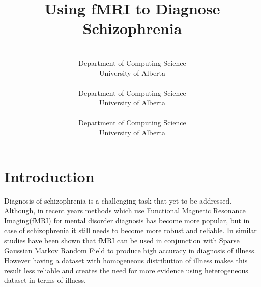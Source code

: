 \documentclass{article} %
\title{Using fMRI to Diagnose Schizophrenia}
\author{%
	\\
	Department of Computing Science\\
	University of Alberta\\
	\texttt{} 
\And 
 \\
Department of Computing Science\\
University of Alberta\\
\texttt{}
\And 
\\
Department of Computing Science\\
University of Alberta\\
\texttt{}  
}
\begin{document}
	\maketitle
	\begin{abstract}
		      
	\end{abstract}
	\section{Introduction}
	Diagnosis of schizophrenia is a challenging task that yet to be addressed\cite{McGuire200891}. Although, in recent years methods which use Functional Magnetic Resonance Imaging(fMRI) for mental disorder diagnosis has become more popular, but in case of schizophrenia it still needs to become more robust and reliable. In similar studies\cite{Rish_2013}\cite{Rosa_2013} have been shown that fMRI can be used in conjunction with Sparse Gaussian Markov Random Field to produce high accuracy in diagnosis of illness. However having a dataset with homogeneous distribution of illness makes this result less reliable and creates the need for more evidence using heterogeneous dataset in terms of illness. 
	
	
	
	
\end{document}
